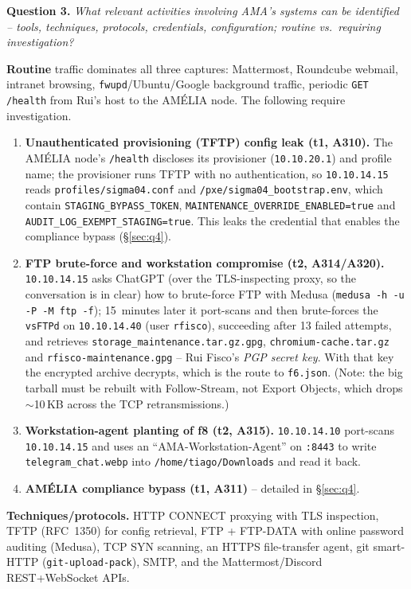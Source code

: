 \documentclass[11pt,a4paper,final,oneside]{article}
\begin{document}
\textbf{Question 3.} \textit{What relevant activities involving AMA's systems can
be identified -- tools, techniques, protocols, credentials, configuration;
routine vs.\ requiring investigation?}

\textbf{Routine} traffic dominates all three captures: Mattermost, Roundcube
webmail, intranet browsing, \texttt{fwupd}/Ubuntu/Google background traffic,
periodic \texttt{GET /health} from Rui's host to the AMÉLIA node. The following
require investigation.

\begin{enumerate}
  \item \textbf{Unauthenticated provisioning (TFTP) config leak (t1, A310).} The
  AMÉLIA node's \texttt{/health} discloses its provisioner (\texttt{10.10.20.1})
  and profile name; the provisioner runs TFTP with no authentication, so
  \texttt{10.10.14.15} reads \texttt{profiles/sigma04.conf} and
  \texttt{/pxe/sigma04\_bootstrap.env}, which contain
  \texttt{STAGING\_BYPASS\_TOKEN}, \texttt{MAINTENANCE\_OVERRIDE\_ENABLED=true}
  and \texttt{AUDIT\_LOG\_EXEMPT\_STAGING=true}. This leaks the credential that
  enables the compliance bypass (§\ref{sec:q4}).
  \item \textbf{FTP brute-force and workstation compromise (t2, A314/A320).}
  \texttt{10.10.14.15} asks ChatGPT (over the TLS-inspecting proxy, so the
  conversation is in clear) how to brute-force FTP with Medusa
  (\texttt{medusa -h -u -P -M ftp -f}); 15~minutes later it port-scans and then
  brute-forces the \texttt{vsFTPd} on \texttt{10.10.14.40} (user \texttt{rfisco}),
  succeeding after 13 failed attempts, and retrieves
  \texttt{storage\_maintenance.tar.gz.gpg}, \texttt{chromium-cache.tar.gz} and
  \texttt{rfisco-maintenance.gpg} -- Rui Fisco's \emph{PGP secret key}. With that
  key the encrypted archive decrypts, which is the route to \texttt{f6.json}.
  (Note: the big tarball must be rebuilt with Follow-Stream, not Export Objects,
  which drops $\sim$10\,KB across the TCP retransmissions.)
  \item \textbf{Workstation-agent planting of f8 (t2, A315).} \texttt{10.10.14.10}
  port-scans \texttt{10.10.14.15} and uses an ``AMA-Workstation-Agent'' on
  \texttt{:8443} to write \texttt{telegram\_chat.webp} into
  \texttt{/home/tiago/Downloads} and read it back.
  \item \textbf{AMÉLIA compliance bypass (t1, A311)} -- detailed in
  §\ref{sec:q4}.
\end{enumerate}

\textbf{Techniques/protocols.} HTTP CONNECT proxying with TLS inspection, TFTP
(RFC~1350) for config retrieval, FTP + FTP-DATA with online password auditing
(Medusa), TCP SYN scanning, an HTTPS file-transfer agent, git smart-HTTP
(\texttt{git-upload-pack}), SMTP, and the Mattermost/Discord REST+WebSocket APIs.
\end{document}
